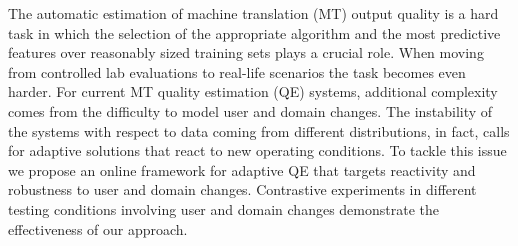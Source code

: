 The automatic estimation of machine translation (MT) output quality is a hard task in which the selection of the appropriate algorithm and the most predictive features over reasonably sized training sets plays a crucial role. When moving from controlled lab evaluations to real-life scenarios the task becomes even harder. For current MT quality estimation (QE) systems, additional complexity comes from the difficulty to model user and domain changes. The instability of the systems with respect to data coming from different distributions, in fact, calls for adaptive solutions that react to new operating conditions. To tackle this issue we propose an online framework for adaptive QE that targets reactivity and robustness to user and domain changes. Contrastive experiments in different testing conditions involving user and domain changes demonstrate the effectiveness of our approach.
